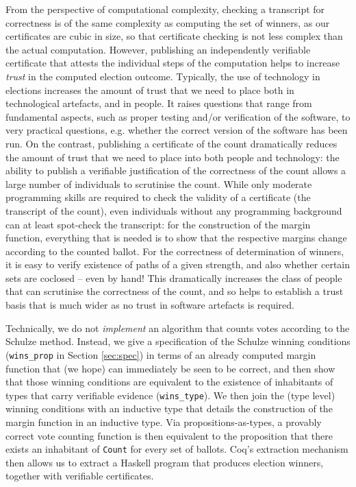 From the perspective of computational complexity, checking a
transcript for correctness is of the same complexity as computing
the set of winners, as our certificates are cubic in size, so that
certificate checking is not less complex than the actual
computation. 
However, publishing an independently verifiable certificate that
attests the individual steps of the computation helps to increase
\emph{trust} in the computed election outcome. Typically, the use of technology in
elections increases the amount of trust that we need to place both
in technological artefacts, and in people. It raises questions that
range from fundamental aspects, such as proper testing and/or
verification of the software, to very practical questions, e.g.
whether the correct version of the software has been run.  On the
contrast, publishing a certificate of the count dramatically reduces
the amount of trust that we need to place into both people and
technology: the ability to publish a verifiable justification of the
correctness of the count allows a large number of individuals to
scrutinise the count. While only moderate programming skills are
required to check the validity of a certificate (the transcript of
the count), even individuals without any programming background can
at least spot-check the transcript: for the construction of the
margin function, everything that is needed is to show that the
respective margins change according to the counted ballot. For the
correctness of determination of winners, it is easy to verify
existence of paths of a given strength, and also whether certain
sets are coclosed -- even by hand! This dramatically increases the
class of people that can scrutinise the correctness of the count,
and so helps to establish a trust basis that is much wider as no
trust in software artefacts is required.


Technically, we do not \emph{implement} an algorithm that counts
votes according to the Schulze method. Instead, we give a
specification of the Schulze winning conditions 
(\texttt{wins\_prop} in  Section \ref{sec:spec}) in terms of an
already computed margin function that
(we hope) can immediately be seen to be correct, and then show that those
winning conditions are equivalent to the existence of inhabitants of
types that carry verifiable evidence (\texttt{wins\_type}).  We then
join the (type level) winning conditions with an inductive type that
details the construction of the margin function in an inductive
type. Via propositions-as-types, a provably correct vote counting
function is then equivalent to the proposition that there exists an
inhabitant of \texttt{Count} for every set of ballots.  Coq's
extraction mechanism then allows us to extract a Haskell program
that produces election winners, together with verifiable
certificates. 

